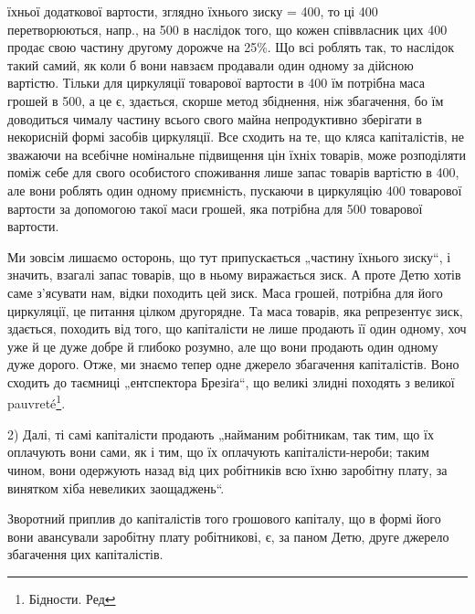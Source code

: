 \parcont{}  %
їхньої додаткової вартости, зглядно їхнього зиску = 400, то
ці 400 перетворюються, напр., на 500 в наслідок
того, що кожен співвласник цих 400 продає свою частину другому
дорожче на 25\%. Що всі роблять так, то наслідок такий самий,
як коли б вони навзаєм продавали один одному за дійсною вартістю.
Тільки для циркуляції товарової вартости в 400 їм потрібна
маса грошей в 500, а це є, здається, скорше метод збіднення,
ніж збагачення, бо їм доводиться чималу частину всього свого майна
непродуктивно зберігати в некорисній формі засобів циркуляції. Все
сходить на те, що кляса капіталістів, не зважаючи на всебічне номінальне
підвищення цін їхніх товарів, може розподіляти поміж себе для свого
особистого споживання лише запас товарів вартістю в 400, але вони роблять один одному приємність, пускаючи в циркуляцію
400 товарової вартости за допомогою такої маси грошей,
яка потрібна для 500 товарової вартости.

Ми зовсім лишаємо осторонь, що тут припускається „частину їхнього
зиску“, і значить, взагалі запас товарів, що в ньому виражається зиск.
А проте Детю хотів саме з’ясувати нам, відки походить цей зиск. Маса
грошей, потрібна для його циркуляції, це питання цілком другорядне. Та маса
товарів, яка репрезентує зиск, здається, походить від того, що капіталісти
не лише продають її один одному, хоч уже й це дуже добре й
глибоко розумно, але що вони продають один одному дуже дорого.
Отже, ми знаємо тепер одне джерело збагачення капіталістів. Воно сходить
до таємниці „ентспектора Брезіґа“, що великі злидні походять з великої
pauvreté\footnote*{
Бідности. Ред
}.

2) Далі, ті самі капіталісти продають „найманим робітникам, так тим,
що їх оплачують вони сами, як і тим, що їх оплачують капіталісти-нероби;
таким чином, вони одержують назад від цих робітників всю їхню заробітну
плату, за винятком хіба невеликих заощаджень“.

Зворотний приплив до капіталістів того грошового капіталу, що
в формі його вони авансували заробітну плату робітникові, є, за паном
Детю, друге джерело збагачення цих капіталістів.

